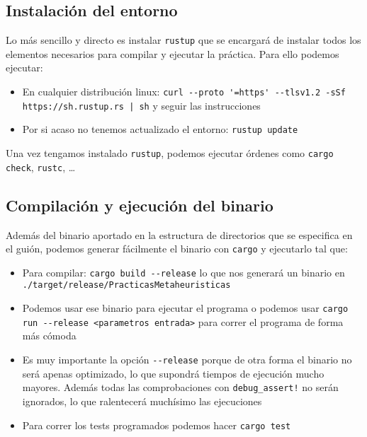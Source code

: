 \documentclass[11pt]{article}
\begin{document}
\subsection{Instalación del entorno}

Lo más sencillo y directo es instalar \lstinline{rustup} \footnotemark que se encargará de instalar todos los elementos necesarios para compilar y ejecutar la práctica. Para ello podemos ejecutar:

\begin{itemize}
    \item En cualquier distribución linux: \lstinline{curl --proto '=https' --tlsv1.2 -sSf https://sh.rustup.rs | sh} y seguir las instrucciones
    \item Por si acaso no tenemos actualizado el entorno: \lstinline{rustup update}
\end{itemize}

Una vez tengamos instalado \lstinline{rustup}, podemos ejecutar órdenes como \lstinline{cargo check}, \lstinline{rustc}, \ldots


\subsection{Compilación y ejecución del binario}

Además del binario aportado en la estructura de directorios que se especifica en el guión, podemos generar fácilmente el binario con \lstinline{cargo} y ejecutarlo tal que:

\begin{itemize}
    \item Para compilar: \lstinline{cargo build --release} lo que nos generará un binario en \lstinline{./target/release/PracticasMetaheuristicas}
    \item Podemos usar ese binario para ejecutar el programa o podemos usar \lstinline{cargo run --release <parametros entrada>} para correr el programa de forma más cómoda
    \item Es muy importante la opción \lstinline{--release} porque de otra forma el binario no será apenas optimizado, lo que supondrá tiempos de ejecución mucho mayores. Además todas las comprobaciones con \lstinline{debug_assert!} no serán ignorados, lo que ralentecerá muchísimo las ejecuciones
    \item Para correr los tests programados podemos hacer \lstinline{cargo test}
\end{itemize}
\end{document}
